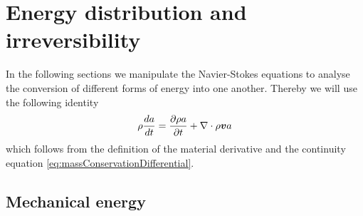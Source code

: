\section{Energy distribution and irreversibility}

In the following sections we manipulate the Navier-Stokes equations to
analyse the conversion of different forms of energy into one
another. Thereby we will use the following identity
\begin{equation}
  \begin{split}
    \rho \frac{da}{dt} = \frac{\partial  \rho a}{\partial t} + \nabla \cdot \rho \boldsymbol {v} a
  \end{split}
  \label{eq:materialToConservative}
\end{equation}
which follows from the definition of the material derivative and the
continuity equation \ref{eq:massConservationDifferential}.

\subsection{Mechanical energy}

